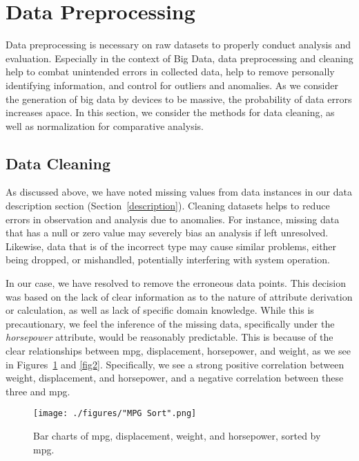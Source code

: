 \documentclass[10pt, conference, compsocconf]{IEEEtran}
\begin{document}
\section{Data Preprocessing}\label{preprocessing}

Data preprocessing is necessary on raw datasets to properly conduct analysis and evaluation. Especially in the context of Big Data, data preprocessing and cleaning help to combat unintended errors in collected data, help to remove personally identifying information, and control for outliers and anomalies. As we consider the generation of big data by devices to be massive, the probability of data errors increases apace. In this section, we consider the methods for data cleaning, as well as normalization for comparative analysis.

\subsection{Data Cleaning}

As discussed above, we have noted missing values from data instances in our data description section (Section~\ref{description}). Cleaning datasets helps to reduce errors in observation and analysis due to anomalies. For instance, missing data that has a null or zero value may severely bias an analysis if left unresolved. Likewise, data that is of the incorrect type may cause similar problems, either being dropped, or mishandled, potentially interfering with system operation. 

In our case, we have resolved to remove the erroneous data points. This decision was based on the lack of clear information as to the nature of attribute derivation or calculation, as well as lack of specific domain knowledge. While this is precautionary, we feel the inference of the missing data, specifically under the \textit{horsepower} attribute, would be reasonably predictable. This is because of the clear relationships between mpg, displacement, horsepower, and weight, as we see in Figures~\ref{fig1} and \ref{fig2}. Specifically, we see a strong positive correlation between weight, displacement, and horsepower, and a negative correlation between these three and mpg.

\begin{figure}[htb]
	\centering
	\texttt{[image: ./figures/"MPG Sort".png]}\\
	\vspace{0.04cm}
	\caption{Bar charts of mpg, displacement, weight, and horsepower, sorted by mpg.}
	\vspace{0.01cm}
	\label{fig1}
\end{figure}
\end{document}
